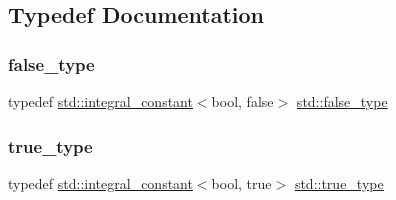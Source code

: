 \subsection{Typedef Documentation}
\hypertarget{namespacestd_a4d6c2e22a7f5a344d0170494bbb065e3}{}\label{namespacestd_a4d6c2e22a7f5a344d0170494bbb065e3} 
\subsubsection{\texorpdfstring{false\+\_\+type}{false\_type}}
{\footnotesize\ttfamily typedef \hyperlink{structstd_1_1integral__constant}{std\+::integral\+\_\+constant}$<$bool, false$>$ \hyperlink{namespacestd_a4d6c2e22a7f5a344d0170494bbb065e3}{std\+::false\+\_\+type}}

\hypertarget{namespacestd_aa6e018097e10f59c32d1d85a983fb30e}{}\label{namespacestd_aa6e018097e10f59c32d1d85a983fb30e} 
\subsubsection{\texorpdfstring{true\+\_\+type}{true\_type}}
{\footnotesize\ttfamily typedef \hyperlink{structstd_1_1integral__constant}{std\+::integral\+\_\+constant}$<$bool, true$>$ \hyperlink{namespacestd_aa6e018097e10f59c32d1d85a983fb30e}{std\+::true\+\_\+type}}


